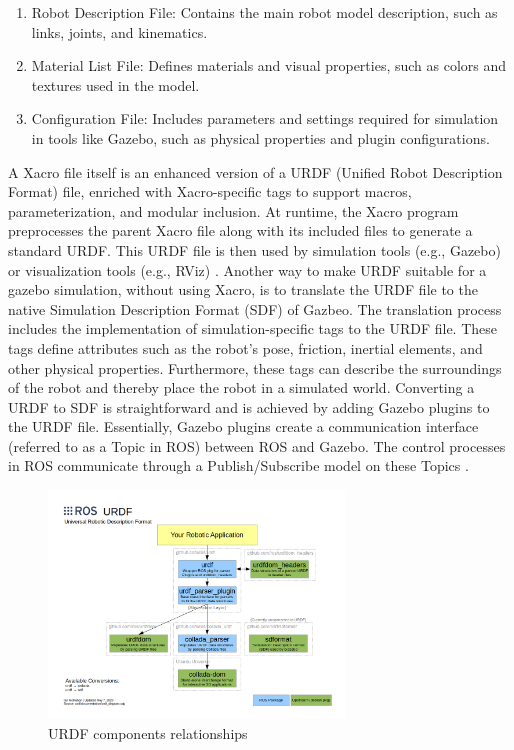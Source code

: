\begin{enumerate}
    \item Robot Description File: Contains the main robot model description, such as links, joints, and kinematics.
    \item Material List File: Defines materials and visual properties, such as colors and textures used in the model.
    \item Configuration File: Includes parameters and settings required for simulation in tools like Gazebo, such as physical properties and plugin configurations.
\end{enumerate}

A Xacro file itself is an enhanced version of a URDF (Unified Robot Description Format) file, enriched with Xacro-specific tags to support macros, parameterization, and modular inclusion.
At runtime, the Xacro program preprocesses the parent Xacro file along with its included files to generate a standard URDF. This URDF file is then used by simulation tools (e.g., Gazebo) or visualization tools (e.g., RViz) \autocite{albergoUnderstandingXacroMisunderstandings2022}.
Another way to make URDF suitable for a gazebo simulation, without using Xacro, is to translate the URDF file to the native Simulation Description Format (SDF) of Gazbeo. The translation process includes the implementation of simulation-specific tags to the URDF file. These tags define attributes such as the robot's pose, friction, inertial elements, and other physical properties. Furthermore, these tags can describe the surroundings of the robot and thereby place the robot in a simulated world. 
Converting a URDF to SDF is straightforward and is achieved by adding Gazebo plugins to the URDF file. Essentially, Gazebo plugins create a communication interface (referred to as a Topic in ROS) between ROS and Gazebo. The control processes in ROS communicate through a Publish/Subscribe model on these Topics \autocite{takayaSimulationEnvironmentMobile2016}.

\begin{figure}[h]
    \centering
    \includegraphics[width=0.7\textwidth]{Figures/urdf_diagram.png}
    \caption{URDF components relationships}
    \label{fig:URDF_comp}
\end{figure}
\autocite{openroboticsUrdfROSWiki}
